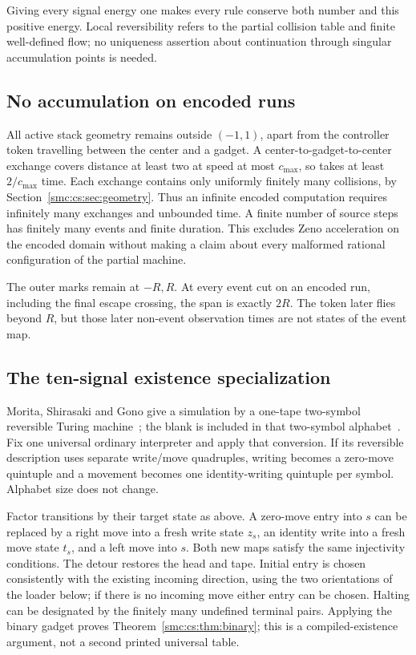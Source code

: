 \documentclass[11pt,letterpaper]{article}
\numberwithin{equation}{section}
\theoremstyle{definition}
\theoremstyle{remark}
\begin{document}
Giving every signal energy one makes every rule conserve both number and this positive energy. Local reversibility refers to the partial collision table and finite well-defined flow; no uniqueness assertion about continuation through singular accumulation points is needed.

\subsection{No accumulation on encoded runs}\label{smc:cs:sec:nozeno}
All active stack geometry remains outside $(-1,1)$, apart from the controller token travelling between the center and a gadget. A center-to-gadget-to-center exchange covers distance at least two at speed at most $c_{\max}$, so takes at least $2/c_{\max}$ time. Each exchange contains only uniformly finitely many collisions, by Section~\ref{smc:cs:sec:geometry}. Thus an infinite encoded computation requires infinitely many exchanges and unbounded time. A finite number of source steps has finitely many events and finite duration. This excludes Zeno acceleration on the encoded domain without making a claim about every malformed rational configuration of the partial machine.

The outer marks remain at $-R,R$. At every event cut on an encoded run, including the final escape crossing, the span is exactly $2R$. The token later flies beyond $R$, but those later non-event observation times are not states of the event map.

\subsection{The ten-signal existence specialization}
Morita, Shirasaki and Gono give a simulation by a one-tape two-symbol reversible Turing machine~\cite{msg1989}; the blank is included in that two-symbol alphabet~\cite{morita2008}. Fix one universal ordinary interpreter and apply that conversion. If its reversible description uses separate write/move quadruples, writing becomes a zero-move quintuple and a movement becomes one identity-writing quintuple per symbol. Alphabet size does not change.

Factor transitions by their target state as above. A zero-move entry into $s$ can be replaced by a right move into a fresh write state $z_s$, an identity write into a fresh move state $t_s$, and a left move into $s$. Both new maps satisfy the same injectivity conditions. The detour restores the head and tape. Initial entry is chosen consistently with the existing incoming direction, using the two orientations of the loader below; if there is no incoming move either entry can be chosen. Halting can be designated by the finitely many undefined terminal pairs. Applying the binary gadget proves Theorem~\ref{smc:cs:thm:binary}; this is a compiled-existence argument, not a second printed universal table.
\end{document}
